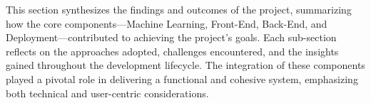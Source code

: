 This section synthesizes the findings and outcomes of the project, 
summarizing how the core components—Machine Learning, Front-End, 
Back-End, and Deployment—contributed to achieving the project’s goals. 
Each sub-section reflects on the approaches adopted, challenges encountered, 
and the insights gained throughout the development lifecycle. The integration
of these components played a pivotal role in delivering a functional and cohesive 
system, emphasizing both technical and user-centric considerations.